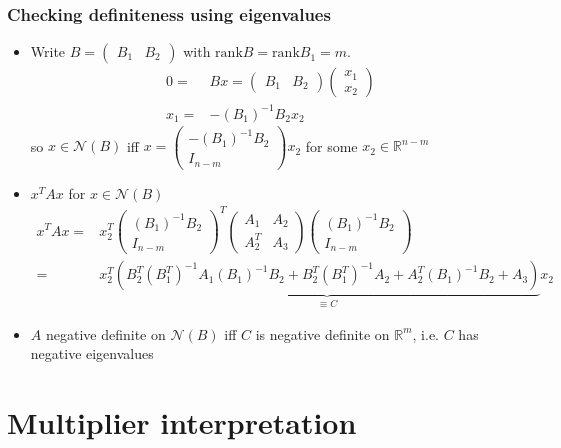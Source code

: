 \documentclass[compress]{beamer}
\def\R{\mathbb{R}}
\newcommand{\rank}{\mathrm{rank}}
\begin{document}
\begin{frame}[shrink]\frametitle{Checking definiteness using eigenvalues}
  \begin{itemize}
  \item Write $B = \begin{pmatrix} B_1 & B_2 \end{pmatrix}$ with
    $\rank B = \rank B_1 = m$. 
    \begin{align*}
      0 = & B x = \begin{pmatrix} B_1 & B_2 \end{pmatrix} \begin{pmatrix}
        x_1 \\ x_2 \end{pmatrix} \\
      x_1 = & -(B_1)^{-1} B_2 x_2
    \end{align*}    
    so $x \in \mathcal{N}(B)$ iff 
    $
      x = \begin{pmatrix} -(B_1)^{-1} B_2 \\ I_{n-m} \end{pmatrix} x_2
    $
    for some $x_2 \in \R^{n-m}$
  \item $x^T A x$ for $x \in \mathcal{N}(B)$
    \begin{align*}
      x^T A x = & x_2^T \begin{pmatrix}
        (B_1)^{-1} B_2 \\ I_{n-m} \end{pmatrix}^T \begin{pmatrix} A_1 & A_2
        \\ A_2^T & A_3 \end{pmatrix} \begin{pmatrix}
        (B_1)^{-1} B_2 \\ I_{n-m} \end{pmatrix} \\
      = & x_2^T \underbrace{\left( B_2^T (B_1^T)^{-1} A_1 (B_1)^{-1} B_2 +
        B_2^T (B_1^T)^{-1} A_2 +  A_2^T (B_1)^{-1} B_2 +
        A_3\right)}_{\equiv C} x_2
    \end{align*}
  \item $A$ negative definite on $\mathcal{N}(B)$ iff $C$ is negative
    definite on $\R^m$, i.e. $C$ has negative eigenvalues
  \end{itemize}
\end{frame}
\section{Multiplier interpretation}
\end{document}
